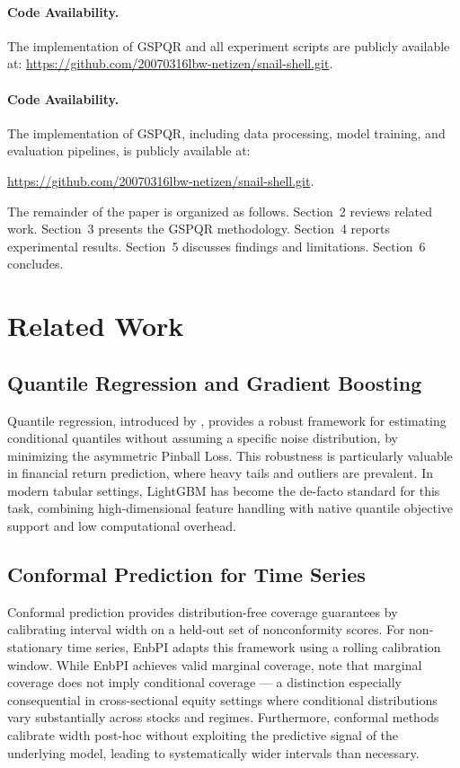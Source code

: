 \documentclass[12pt, a4paper]{article}
\begin{document}
\paragraph{Code Availability.}
The implementation of GSPQR and all experiment scripts are publicly available at:
\url{https://github.com/20070316lbw-netizen/snail-shell.git}.

\paragraph{Code Availability.}
The implementation of GSPQR, including data processing, model training, and evaluation pipelines, is publicly available at:

\url{https://github.com/20070316lbw-netizen/snail-shell.git}.

The remainder of the paper is organized as follows. Section~2 reviews related work.
Section~3 presents the GSPQR methodology. Section~4 reports experimental results.
Section~5 discusses findings and limitations. Section~6 concludes.

\section{Related Work}

\subsection{Quantile Regression and Gradient Boosting}

Quantile regression, introduced by \citet{koenker1978}, provides a robust framework
for estimating conditional quantiles without assuming a specific noise distribution,
by minimizing the asymmetric Pinball Loss. This robustness is particularly valuable
in financial return prediction, where heavy tails and outliers are prevalent. In modern
tabular settings, LightGBM \citep{ke2017} has become the de-facto standard for this
task, combining high-dimensional feature handling with native quantile objective support
and low computational overhead.

\subsection{Conformal Prediction for Time Series}

Conformal prediction \citep{vovk2005} provides distribution-free coverage guarantees
by calibrating interval width on a held-out set of nonconformity scores. For
non-stationary time series, EnbPI \citep{xu2021} adapts this framework using a
rolling calibration window. While EnbPI achieves valid marginal coverage, \citet{barber2023}
note that marginal coverage does not imply conditional coverage --- a distinction
especially consequential in cross-sectional equity settings where conditional
distributions vary substantially across stocks and regimes. Furthermore, conformal
methods calibrate width post-hoc without exploiting the predictive signal of the
underlying model, leading to systematically wider intervals than necessary.
\end{document}

